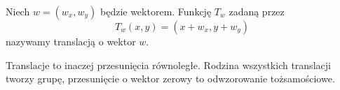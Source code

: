 
\begin{definition}[translacja]
    Niech $w = (w_x, w_y)$ będzie wektorem.
    Funkcję $T_w$ zadaną przez
    \begin{equation}
        T_w(x, y) = (x + w_x, y + w_y)
    \end{equation}
    nazywamy translacją o wektor $w$.
\end{definition}

Translacje to inaczej przesunięcia równoległe.
Rodzina wszystkich translacji tworzy grupę, przesunięcie o wektor zerowy to odwzorowanie tożsamościowe.
